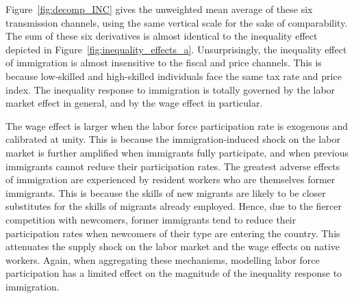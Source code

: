 \documentclass[a4paper,12pt]{article}
\begin{document}
Figure~\ref{fig:decomp_INC} gives the unweighted mean average of these six transmission channels, using the same vertical scale for the sake of comparability. The sum of these six derivatives is almost identical to the inequality effect depicted in Figure~\ref{fig:inequality_effects_a}. Unsurprisingly, the inequality effect of immigration is almost insensitive to the fiscal and price channels. This is because low-skilled and high-skilled individuals face the same tax rate and price index. The inequality response to immigration is totally governed by the labor market effect in general, and by the wage effect in particular.

The wage effect is larger when the labor force participation rate is exogenous and calibrated at unity. This is because the immigration-induced shock on the labor market is further amplified when immigrants fully participate, and when previous immigrants cannot reduce their participation rates. The greatest adverse effects of immigration are experienced by resident workers who are themselves former immigrants. This is because the skills of new migrants are likely to be closer substitutes for the skills of migrants already employed. Hence, due to the fiercer competition with newcomers, former immigrants tend to reduce their participation rates when newcomers of their type are entering the country. This attenuates the supply shock on the labor market and the wage effects on native workers. Again, when aggregating these mechanisms, modelling labor force participation has a limited effect on the magnitude of the inequality response to immigration.
\end{document}

